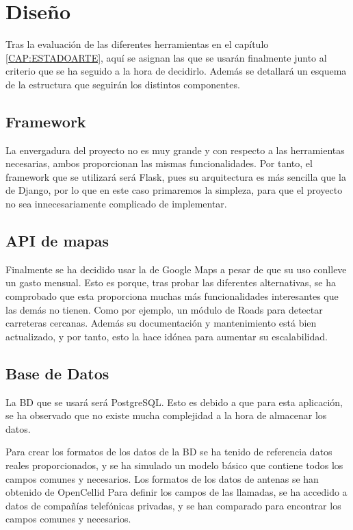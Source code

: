  
\section{Diseño\label{SEC:DISENO}}
  Tras la evaluación de las diferentes herramientas en el capítulo \ref{CAP:ESTADOARTE}, aquí se asignan las que se usarán finalmente junto al criterio que se ha seguido a la hora de decidirlo. Además se detallará un esquema de la estructura que seguirán los distintos componentes.
  
  
  \subsection{Framework}
    La envergadura del proyecto no es muy grande y con respecto a las herramientas necesarias, ambos proporcionan las mismas funcionalidades. Por tanto, el framework que se utilizará será Flask, pues su arquitectura es más sencilla que la de Django, por lo que en este caso primaremos la simpleza, para que el proyecto no sea innecesariamente complicado de implementar.


  \subsection{API de mapas}
    Finalmente se ha decidido usar la  de Google Maps\cite{gmaps} a pesar de que su uso conlleve un gasto mensual. Esto es porque, tras probar las diferentes alternativas, se ha comprobado que esta  proporciona muchas más funcionalidades interesantes que las demás no tienen. Como por ejemplo, un módulo de Roads para detectar carreteras cercanas.
    Además su documentación y mantenimiento está bien actualizado, y por tanto, esto la hace idónea para aumentar su escalabilidad.
    
    
  \subsection{Base de Datos}
    La BD que se usará será PostgreSQL. Esto es debido a que para esta aplicación, se ha observado que no existe mucha complejidad a la hora de almacenar los datos.
    
    Para crear los formatos de los datos de la BD se ha tenido de referencia datos reales proporcionados, y se ha simulado un modelo básico que contiene todos los campos comunes y necesarios.
    Los formatos de los datos de antenas se han obtenido de OpenCellid \cite{opencellid}
    Para definir los campos de las llamadas, se ha accedido a datos de compañías telefónicas privadas, y se han comparado para encontrar los campos comunes y necesarios.
       
